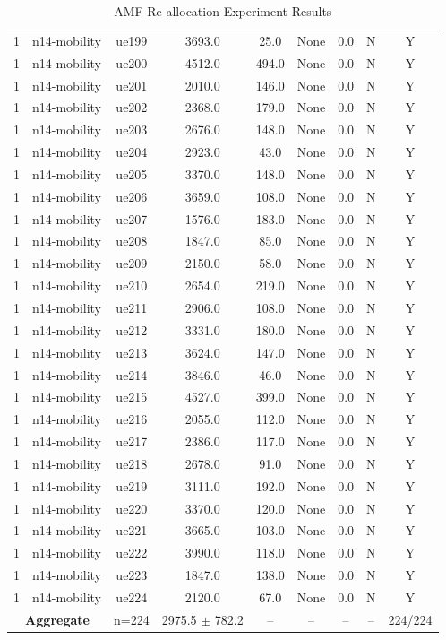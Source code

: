 \begin{table}[ht]
\begin{tabular}{|c|c|c|c|c|c|c|c|c|}
1 & n14-mobility & ue199 & 3693.0 & 25.0 & None & 0.0 & N & Y \\
1 & n14-mobility & ue200 & 4512.0 & 494.0 & None & 0.0 & N & Y \\
1 & n14-mobility & ue201 & 2010.0 & 146.0 & None & 0.0 & N & Y \\
1 & n14-mobility & ue202 & 2368.0 & 179.0 & None & 0.0 & N & Y \\
1 & n14-mobility & ue203 & 2676.0 & 148.0 & None & 0.0 & N & Y \\
1 & n14-mobility & ue204 & 2923.0 & 43.0 & None & 0.0 & N & Y \\
1 & n14-mobility & ue205 & 3370.0 & 148.0 & None & 0.0 & N & Y \\
1 & n14-mobility & ue206 & 3659.0 & 108.0 & None & 0.0 & N & Y \\
1 & n14-mobility & ue207 & 1576.0 & 183.0 & None & 0.0 & N & Y \\
1 & n14-mobility & ue208 & 1847.0 & 85.0 & None & 0.0 & N & Y \\
1 & n14-mobility & ue209 & 2150.0 & 58.0 & None & 0.0 & N & Y \\
1 & n14-mobility & ue210 & 2654.0 & 219.0 & None & 0.0 & N & Y \\
1 & n14-mobility & ue211 & 2906.0 & 108.0 & None & 0.0 & N & Y \\
1 & n14-mobility & ue212 & 3331.0 & 180.0 & None & 0.0 & N & Y \\
1 & n14-mobility & ue213 & 3624.0 & 147.0 & None & 0.0 & N & Y \\
1 & n14-mobility & ue214 & 3846.0 & 46.0 & None & 0.0 & N & Y \\
1 & n14-mobility & ue215 & 4527.0 & 399.0 & None & 0.0 & N & Y \\
1 & n14-mobility & ue216 & 2055.0 & 112.0 & None & 0.0 & N & Y \\
1 & n14-mobility & ue217 & 2386.0 & 117.0 & None & 0.0 & N & Y \\
1 & n14-mobility & ue218 & 2678.0 & 91.0 & None & 0.0 & N & Y \\
1 & n14-mobility & ue219 & 3111.0 & 192.0 & None & 0.0 & N & Y \\
1 & n14-mobility & ue220 & 3370.0 & 120.0 & None & 0.0 & N & Y \\
1 & n14-mobility & ue221 & 3665.0 & 103.0 & None & 0.0 & N & Y \\
1 & n14-mobility & ue222 & 3990.0 & 118.0 & None & 0.0 & N & Y \\
1 & n14-mobility & ue223 & 1847.0 & 138.0 & None & 0.0 & N & Y \\
1 & n14-mobility & ue224 & 2120.0 & 67.0 & None & 0.0 & N & Y \\
\multicolumn{2}{|c|}{\textbf{Aggregate}} & n=224 & 2975.5 $\pm$ 782.2 & -- & -- & -- & -- & 224/224 \\
\hline
\end{tabular}
\caption{AMF Re-allocation Experiment Results}
\label{tab:amf_realloc}
\end{table}
